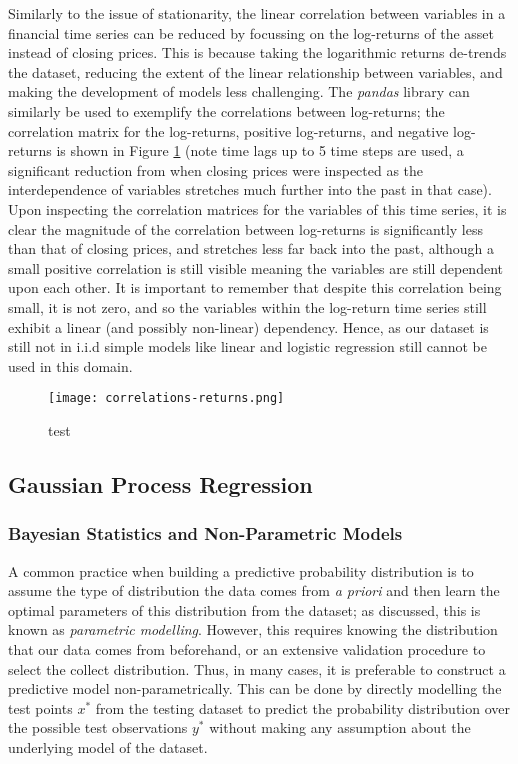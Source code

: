 \documentclass[a4paper, 11pt]{article}
\begin{document}
    Similarly to the issue of stationarity, the linear correlation between variables in a financial time series can be reduced by focussing on the log-returns of the asset instead of closing prices. This is because taking the logarithmic returns de-trends the dataset, reducing the extent of the linear relationship between variables, and making the development of models less challenging. The \emph{pandas} library can similarly be used to exemplify the correlations between log-returns; the correlation matrix for the log-returns, positive log-returns, and negative log-returns is shown in Figure \ref{fig:corr-returns} (note time lags up to 5 time steps are used, a significant reduction from when closing prices were inspected as the interdependence of variables stretches much further into the past in that case). Upon inspecting the correlation matrices for the variables of this time series, it is clear the magnitude of the correlation between log-returns is significantly less than that of closing prices, and stretches less far back into the past, although a small positive correlation is still visible meaning the variables are still dependent upon each other. It is important to remember that despite this correlation being small, it is not zero, and so the variables within the log-return time series still exhibit a linear (and possibly non-linear) dependency. Hence, as our dataset is still not in i.i.d simple models like linear and logistic regression still cannot be used in this domain.

    \begin{figure}[ht]
        \caption{test}
        \centering
        \texttt{[image: correlations-returns.png]}
        \label{fig:corr-returns}
    \end{figure}

    \subsection{Gaussian Process Regression}

    \subsubsection{Bayesian Statistics and Non-Parametric Models}

    A common practice when building a predictive probability distribution is to assume the type of distribution the data comes from \emph{a priori} and then learn the optimal parameters of this distribution from the dataset; as discussed, this is known as \emph{parametric modelling}. However, this requires knowing the distribution that our data comes from beforehand, or an extensive validation procedure to select the collect distribution. Thus, in many cases, it is preferable to construct a predictive model non-parametrically. This can be done by directly modelling the test points $x^*$ from the testing dataset to predict the probability distribution over the possible test observations $y^*$ without making any assumption about the underlying model of the dataset. 
\end{document}
